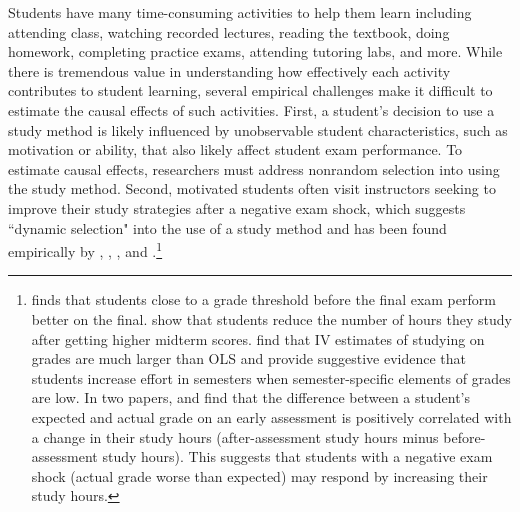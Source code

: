 \documentclass[12pt]{article}
\begin{document}
Students have many time-consuming activities to help them learn including attending class, watching recorded lectures, reading the textbook, doing homework, completing practice exams, attending tutoring labs, and more. While there is tremendous value in understanding how effectively each activity contributes to student learning, several empirical challenges make it difficult to estimate the causal effects of such activities. First, a student's decision to use a study method is likely influenced by unobservable student characteristics, such as motivation or ability, that also likely affect student exam performance. To estimate causal effects, researchers must address nonrandom selection into using the study method. Second, motivated students often visit instructors seeking to improve their study strategies after a negative exam shock, which suggests ``dynamic selection" into the use of a study method and has been found empirically by \textcite{oettinger2002}, \textcite{ko2005}, \textcite{ss2008}, \textcite{bo2012} and \textcite{bo2015}.\footnote{\textcite{oettinger2002} finds that students close to a grade threshold before the final exam perform better on the final. \textcite{ko2005} show that students reduce the number of hours they study after getting higher midterm scores. \textcite{ss2008} find that IV estimates of studying on grades are much larger than OLS and provide suggestive evidence that students increase effort in semesters when semester-specific elements of grades are low. In two papers, \textcite{bo2012} and \textcite{bo2015} find that the difference between a student's expected and actual grade on an early assessment is positively correlated with a change in their study hours (after-assessment study hours minus before-assessment study hours). This suggests that students with a negative exam shock (actual grade worse than expected) may respond by increasing their study hours.}
\end{document}
